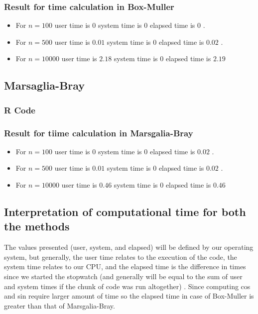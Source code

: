 \documentclass[10pt]{article}
\begin{document}
\subsubsection{Result for time calculation in Box-Muller}
\begin{itemize}
\item For $ n=100 $ user time is $ 0 $ system time is $ 0 $ elapsed time is $ 0 $ .
\item For $ n=500 $ user time is $ 0.01 $ system time is $ 0 $ elapsed time is $ 0.02 $ .
\item For $ n=10000 $ user time is $ 2.18 $ system time is $ 0 $ elapsed time is $ 2.19 $
\end{itemize}
\subsection{Marsaglia-Bray}
\subsubsection{R Code}

\subsubsection{Result for tiime calculation in Marsgalia-Bray }
\begin{itemize}
\item For $ n=100 $ user time is $ 0 $ system time is $ 0 $ elapsed time is $ 0.02 $ .
\item For $ n=500 $ user time is $ 0.01 $ system time is $ 0 $ elapsed time is $ 0.02 $ .
\item For $ n=10000 $ user time is $ 0.46  $ system time is $ 0 $ elapsed time is $ 0.46 $
\end{itemize}
\pagebreak
\subsection{Interpretation of computational time for both the methods}
 The values presented (user, system, and elapsed) will be defined by our operating system, but generally, the user time relates to the execution of the code, the system time relates to our CPU, and the elapsed time is the difference in times since we started the stopwatch (and  generally will be equal to the sum of user and system times if the chunk of code was run altogether) . Since computing cos and sin require larger amount of time so the elapsed time in case of Box-Muller is greater than that of Marsgalia-Bray.
\pagebreak
\end{document}
